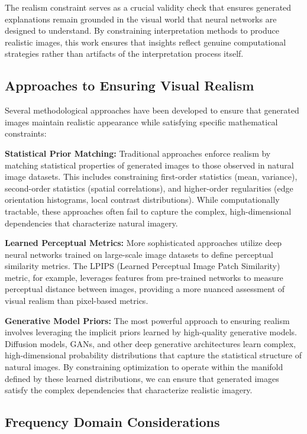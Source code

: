 \documentclass[licencjacka,en]{pracamgr}
\begin{document}
The realism constraint serves as a crucial validity check that ensures generated explanations remain grounded in the visual world that neural networks are designed to understand. By constraining interpretation methods to produce realistic images, this work ensures that insights reflect genuine computational strategies rather than artifacts of the interpretation process itself.

\subsection{Approaches to Ensuring Visual Realism}

Several methodological approaches have been developed to ensure that generated images maintain realistic appearance while satisfying specific mathematical constraints:

\textbf{Statistical Prior Matching:} Traditional approaches enforce realism by matching statistical properties of generated images to those observed in natural image datasets. This includes constraining first-order statistics (mean, variance), second-order statistics (spatial correlations), and higher-order regularities (edge orientation histograms, local contrast distributions). While computationally tractable, these approaches often fail to capture the complex, high-dimensional dependencies that characterize natural imagery.

\textbf{Learned Perceptual Metrics:} More sophisticated approaches utilize deep neural networks trained on large-scale image datasets to define perceptual similarity metrics. The LPIPS (Learned Perceptual Image Patch Similarity) metric, for example, leverages features from pre-trained networks to measure perceptual distance between images, providing a more nuanced assessment of visual realism than pixel-based metrics.

\textbf{Generative Model Priors:} The most powerful approach to ensuring realism involves leveraging the implicit priors learned by high-quality generative models. Diffusion models, GANs, and other deep generative architectures learn complex, high-dimensional probability distributions that capture the statistical structure of natural images. By constraining optimization to operate within the manifold defined by these learned distributions, we can ensure that generated images satisfy the complex dependencies that characterize realistic imagery.

\subsection{Frequency Domain Considerations}
\end{document}
